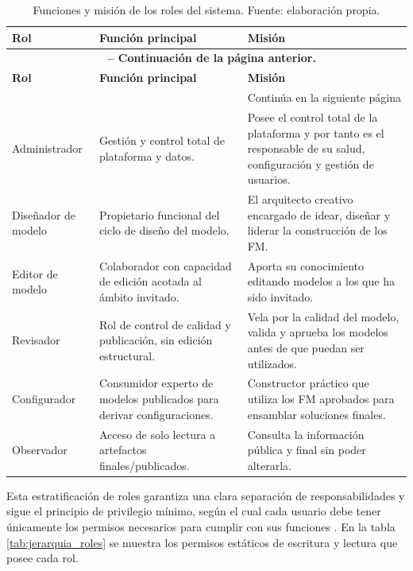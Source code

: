 \small
\renewcommand{\arraystretch}{1.2}
\begin{longtable}{|p{2.6cm}|p{5.3cm}|p{7.0cm}|}
\caption{Funciones y misión de los roles del sistema. Fuente: elaboración propia.\label{tab:funcion_roles}} \\
\hline
\textbf{Rol} & \textbf{Función principal} & \textbf{Misión} \\
\hline
\endfirsthead
\multicolumn{3}{c}{{\bfseries \tablename\ \thetable{} -- Continuación de la página anterior.}} \\
\hline
\textbf{Rol} & \textbf{Función principal} & \textbf{Misión} \\
\hline
\endhead
\hline \multicolumn{3}{|r|}{{Continúa en la siguiente página}} \\ \hline
\endfoot
\hline
\endlastfoot

Administrador & Gestión y control total de plataforma y datos. & Posee el control total de la plataforma y por tanto es el responsable de su salud, configuración y gestión de usuarios. \\
\hline
Diseñador de modelo & Propietario funcional del ciclo de diseño del modelo. & El arquitecto creativo encargado de idear, diseñar y liderar la construcción de los \ac{FM}. \\
\hline
Editor de modelo & Colaborador con capacidad de edición acotada al ámbito invitado. & Aporta su conocimiento editando modelos a los que ha sido invitado. \\
\hline
Revisador & Rol de control de calidad y publicación, sin edición estructural. & Vela por la calidad del modelo, valida y aprueba los modelos antes de que puedan ser utilizados. \\
\hline
Configurador & Consumidor experto de modelos publicados para derivar configuraciones. & Constructor práctico que utiliza los \ac{FM} aprobados para ensamblar soluciones finales. \\
\hline
Observador & Acceso de solo lectura a artefactos finales/publicados. & Consulta la información pública y final sin poder alterarla. \\
\hline
\end{longtable}

Esta estratificación de roles garantiza una clara separación de responsabilidades y sigue el principio 
de privilegio mínimo, según el cual cada usuario debe tener 
únicamente los permisos necesarios para cumplir con sus funciones \citep{saltzer1975protection}. 
En la tabla \ref{tab:jerarquia_roles} se muestra
los permisos estáticos de escritura y lectura que posee cada rol.

